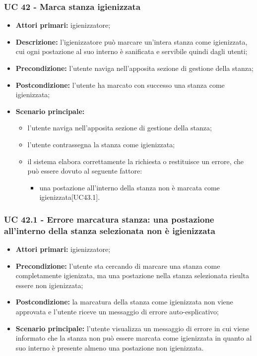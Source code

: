 \subsubsection{UC 42 - Marca stanza igienizzata}

\begin{itemize}
\item \textbf{Attori primari:} igienizzatore;
\item \textbf{Descrizione:} l’igienizzatore può marcare un'intera stanza come igienizzata, cui ogni postazione al suo interno è sanificata e servibile quindi dagli utenti;
\item \textbf{Precondizione:} l'utente naviga nell’apposita sezione di gestione della stanza; 
\item \textbf{Postcondizione:} l'utente ha marcato con successo una stanza come igienizzata;
\item \textbf{Scenario principale:} 
	\begin{itemize}
		\item l’utente naviga nell’apposita sezione di gestione della stanza;	
		\item l'utente contrassegna la stanza come igienizzata;
		\item il sistema elabora correttamente la richiesta o restituisce un errore, che può essere dovuto al seguente fattore:
			\begin {itemize}
				\item una postazione all’interno della stanza non è marcata come igienizzata[UC43.1].
			\end{itemize}
		\end{itemize}
\end{itemize}

\subsubsection{UC 42.1 - Errore marcatura stanza: una postazione all'interno della stanza selezionata non è igienizzata}
\begin{itemize}
\item \textbf{Attori primari:} igienizzatore;
\item \textbf{Precondizione:} l'utente sta cercando di marcare una stanza come completamente igienizata, ma una postazione nella stanza selezionata risulta essere non igienizzata;
\item \textbf{Postcondizione:} la marcatura della stanza come igienizzata non viene approvata e l'utente riceve un messaggio di errore auto-esplicativo;
\item \textbf{Scenario principale:} l'utente visualizza un messaggio di errore in cui viene informato che la stanza non può essere marcata come igienizzata in quanto al suo interno è presente almeno una postazione non igienizzata.
\end{itemize}

